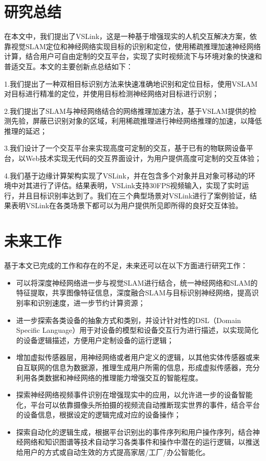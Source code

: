 \section{研究总结}
在本文中，我们提出了VSLink，这是一种基于增强现实的人机交互解决方案，依靠视觉SLAM定位和神经网络实现目标的识别和定位，使用稀疏推理加速神经网络计算，结合用户可自由定制的交互平台，实现了实时视频流下与环境对象的快速和普适交互。本文的主要创新点总结如下：

1.我们提出了一种双相目标识别方法来快速准确地识别和定位目标，使用VSLAM对目标进行精准的定位，并使用目标检测神经网络对目标进行识别；

2.我们提出了SLAM与神经网络结合的网络推理加速方法，基于VSLAM提供的检测先验，屏蔽已识别对象的区域，利用稀疏推理进行神经网络推理的加速，以降低推理的延迟；

3.我们设计了一个交互平台来实现高度可定制的交互，基于已有的物联网设备平台，以Web技术实现无代码的交互界面设计，为用户提供高度可定制的交互体验；

4.我们基于边缘计算架构实现了VSLink，并在包含多个对象并且对象可移动的环境中对其进行了评估。结果表明，VSLink支持30FPS视频输入，实现了实时运行，并且目标识别率达到了{\acc}。我们在三个典型场景对VSLink进行了案例验证，结果表明VSLink在各类场景下都可以为用户提供所见即所得的良好交互体验。

\section{未来工作}
基于本文已完成的工作和存在的不足，未来还可以在以下方面进行研究工作：
\begin{itemize}
	\item 可以将深度神经网络进一步与视觉SLAM进行结合，统一神经网络和SLAM的特征提取，共享图像特征信息，深度融合SLAM与目标识别神经网络，提高识别率和识别速度，进一步节约计算资源；
	\item 进一步探索各类设备的抽象方式和类别，并设计针对性的DSL（Domain Specific Language）用于对设备的模型和设备交互行为进行描述，以实现简化的设备逻辑描述，方便用户定制设备的运行逻辑；
	\item 增加虚拟传感器层，用神经网络或者用户定义的逻辑，以其他实体传感器或来自互联网的信息为数据源，推理生成用户所需的信息，形成虚拟传感器，充分利用各类数据和神经网络的推理能力增强交互的智能程度。
	\item 探索神经网络视频事件识别在增强现实中的应用，以允许进一步的设备智能化，平台可以依靠摄像头所拍摄的视频流自动推断现实世界的事件，结合平台的设备信息，根据设定的逻辑完成对应的设备操作；
	\item 探索自动化的逻辑生成，根据平台识别出的事件序列和用户操作序列，结合神经网络和知识图谱等技术自动学习各类事件和操作中潜在的运行逻辑，以推送给用户的方式或自动生效的方式提高家居/工厂/办公智能化。
\end{itemize}

